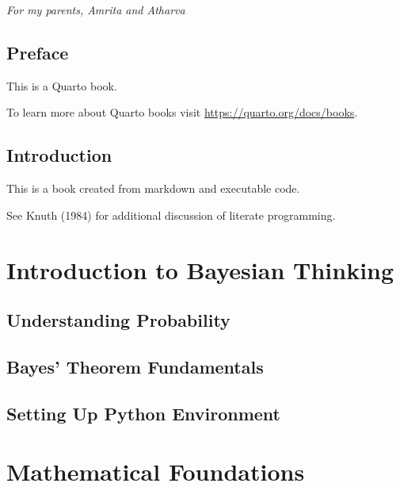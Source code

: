 \documentclass[
  letterpaper,
  paper=6in:9in,pagesize=pdftex,footinclude=on,11pt]{scrreprt}
\renewcommand*\contentsname{Table of contents}
\newcommand\contentsname{Table of contents}
\begin{document}
\vspace*{\baselineskip}
\vspace{20mm} %
\textit{For my parents, Amrita and Atharva}

\newpage
\renewcommand*\contentsname{Table of contents}
{
\hypersetup{linkcolor=}
\setcounter{tocdepth}{1}
\tableofcontents
}


\chapter*{Preface}\label{preface}


This is a Quarto book.

To learn more about Quarto books visit
\url{https://quarto.org/docs/books}.


\chapter{Introduction}\label{introduction}

This is a book created from markdown and executable code.

See Knuth (1984) for additional discussion of literate programming.

\part{Introduction to Bayesian Thinking}

\chapter{Understanding Probability}\label{understanding-probability}

\chapter{Bayes' Theorem Fundamentals}\label{bayes-theorem-fundamentals}

\chapter{Setting Up Python
Environment}\label{setting-up-python-environment}

\part{Mathematical Foundations}
\end{document}
